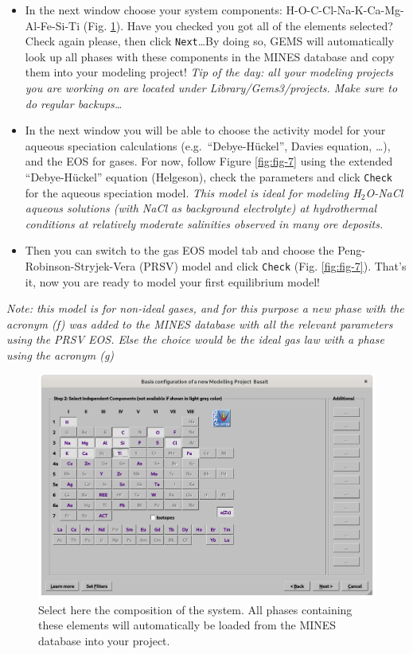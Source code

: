 \documentclass[
]{book}
\begin{document}
\begin{itemize}
\item
  In the next window choose your system components: H-O-C-Cl-Na-K-Ca-Mg-Al-Fe-Si-Ti (Fig. \ref{fig:fig-6}). Have you checked you got all of the elements selected? Check again please, then click \texttt{Next}\ldots By doing so, GEMS will automatically look up all phases with these components in the MINES database and copy them into your modeling project! \emph{Tip of the day: all your modeling projects you are working on are located under Library/Gems3/projects. Make sure to do regular backups\ldots{}}
\item
  In the next window you will be able to choose the activity model for your aqueous speciation calculations (e.g.~``Debye-Hückel'', Davies equation, \ldots), and the EOS for gases. For now, follow Figure \ref{fig:fig-7} using the extended ``Debye-Hückel'' equation (Helgeson), check the parameters and click \texttt{Check} for the aqueous speciation model. \emph{This model is ideal for modeling H\(_2\)O-NaCl aqueous solutions (with NaCl as background electrolyte) at hydrothermal conditions at relatively moderate salinities observed in many ore deposits.}
\item
  Then you can switch to the gas EOS model tab and choose the Peng-Robinson-Stryjek-Vera (PRSV) model and click \texttt{Check} (Fig. \ref{fig:fig-7}). That's it, now you are ready to model your first equilibrium model!
\end{itemize}

\emph{Note: this model is for non-ideal gases, and for this purpose a new phase with the acronym (f) was added to the MINES database with all the relevant parameters using the PRSV EOS. Else the choice would be the ideal gas law with a phase using the acronym (g)}

\begin{figure}
\includegraphics[width=0.8\linewidth]{figures/module1/fig-6} \caption{Select here the composition of the system. All phases containing these elements will automatically be loaded from the MINES database into your project.}\label{fig:fig-6}
\end{figure}
\end{document}
